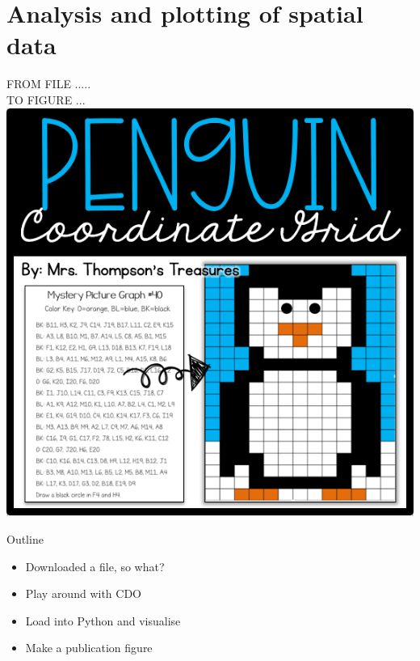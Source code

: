 
\section{Analysis and plotting of spatial data}
\begin{frame}
   \vspace{1cm}
    \Huge{
   FROM FILE  .....   \\
   \vspace{0.5cm}
   \hspace{5cm}  TO FIGURE ...  \\}
   \includegraphics[scale=0.5]{images/penguin-graph-cover.png}
\end{frame}


\begin{frame}{\insertsectionnumber{ |} Outline}
   \begin{itemize}
       \item Downloaded a file, so what?
            \vspace{0.3cm}
       \item Play around with CDO
            \vspace{0.3cm}
       \item Load into Python and visualise
            \vspace{0.3cm}
       \item Make a publication figure
   \end{itemize}
\end{frame}

